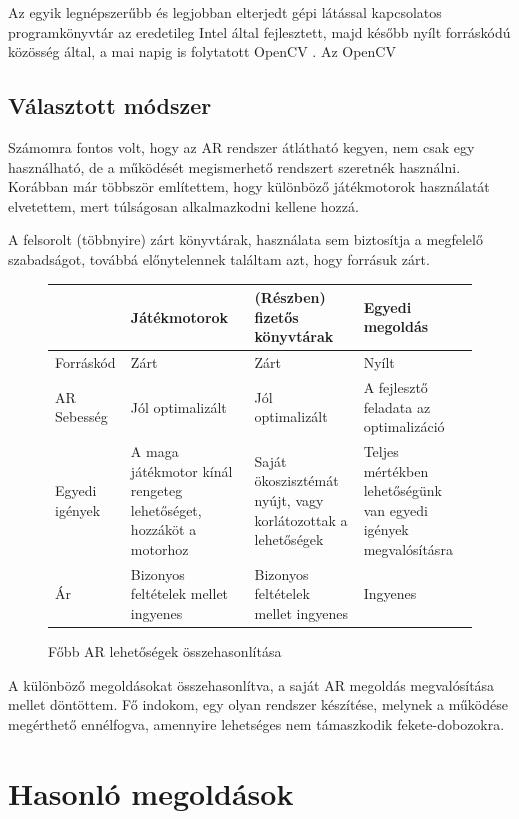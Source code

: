 \documentclass[12pt,a4paper,oneside]{report} %
\begin{document}
\par Az egyik legnépszerűbb és  legjobban elterjedt gépi látással kapcsolatos programkönyvtár az eredetileg Intel által fejlesztett,  majd később nyílt forráskódú közösség által, a mai napig is folytatott OpenCV \cite{opencv_library}. Az OpenCV \cite{pulli2012real} \cite{opencv}
\subsection{Választott módszer}
Számomra fontos volt, hogy az AR rendszer átlátható kegyen, nem csak egy használható, de a működését megismerhető rendszert szeretnék használni. Korábban már többször említettem, hogy különböző játékmotorok használatát elvetettem, mert túlságosan alkalmazkodni kellene hozzá. 
\par A felsorolt (többnyire) zárt könyvtárak, használata sem biztosítja a megfelelő szabadságot, továbbá előnytelennek találtam azt, hogy forrásuk zárt.


\begin{figure}[H]
	\centering
	\begin{tabular}{s|p{3.5cm}|p{3.5cm}|p{3.5cm} }
	& Játékmotorok &(Részben) fizetős könyvtárak &  Egyedi megoldás \\
	\hline
	Forráskód & Zárt & Zárt & Nyílt \\
	AR Sebesség & Jól optimalizált & Jól optimalizált & A fejlesztő feladata az optimalizáció \\
	Egyedi igények   & A maga játékmotor kínál rengeteg lehetőséget, hozzáköt a motorhoz & Saját ökoszisztémát nyújt, vagy korlátozottak a lehetőségek   & Teljes mértékben lehetőségünk van egyedi igények megvalósításra  \\
	Ár & Bizonyos feltételek mellet ingyenes & Bizonyos feltételek mellet ingyenes & Ingyenes\\

	\end{tabular}
	\caption{Főbb AR lehetőségek összehasonlítása}
\end{figure}

A különböző megoldásokat összehasonlítva, a saját AR megoldás megvalósítása mellet döntöttem. Fő indokom, egy olyan rendszer készítése, melynek a működése megérthető ennélfogva, amennyire lehetséges nem támaszkodik fekete-dobozokra.
\section{Hasonló megoldások}
\end{document}
